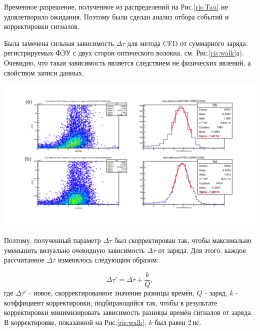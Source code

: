  
Временное разрешение, полученное из распределений на Рис.\ref{ris:Tau} не удовлетворило ожидания. Поэтому были сделан анализ отбора событий и корректировки сигналов. 

Была замечена сильная зависимость $\Delta\tau$ для метода CFD от суммарного заряда, регистрируемых ФЭУ с двух сторон оптического волокна, см. Рис.\ref{ris:walk}а). Очевидно, что такая зависимость является следствием не физических явлений, а свойством записи данных.

{
	\centering
	\includegraphics[width=\linewidth]{walkcorr.png}
	\label{ris:walk}
}



Поэтому, полученный параметр $\Delta\tau$ был скорректирован так, чтобы максимально уменьшить визуально очевидную зависимость $\Delta\tau$ от заряда. Для этого, каждое рассчитанное $\Delta\tau$ изменялось следующим образом:

\begin{equation}
\Delta\tau' = \Delta\tau + \frac{k}{Q},
\end{equation}
где $\Delta\tau'$ - новое, скорректированное значение разницы времён, $Q$ - заряд, $k$ - коэффициент корректировки, подбирающийся так, чтобы в результате корректировки минимизировать зависимость разницы времён сигналов от заряда. В корректировке, показанной на Рис.\ref{ris:walk}, $k$ был равен 2\,нс.

